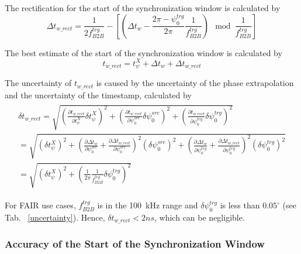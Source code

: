 The rectification for the start of the synchronization window is calculated by
\begin{equation}
\Delta t_\mathit{w\_rect}=\frac{1}{2f^\mathit{trg}_\mathit{B2B}}-[(\Delta t_\mathit{w} - \frac{2\pi-\psi^\mathit{trg}_0}{2\pi}\frac{1}{f^\mathit{trg}_\mathit{B2B}}) \mod \frac{1}{f^\mathit{trg}_\mathit{B2B}}]
\end{equation}

The best estimate of the start of the synchronization window is calculated by
\begin{equation}
t_\mathit{w\_rect}=t_\psi^\mathit{X}+\Delta t_\mathit{w}+\Delta t_\mathit{w\_rect}
\end{equation}

The uncertainty of $t_\mathit{w\_rect}$ is caused by the uncertainty of the phase extrapolation and the uncertainty of the timestamp, calculated by 
\begin{eqnarray}
\begin{aligned}
\delta t_\mathit{w\_rect} =\sqrt {(\frac {\partial t_\mathit{w\_rect}}{\partial t_\psi^\mathit{X}} \delta t_\psi^\mathit{X})^2 +(\frac {\partial t_\mathit{w\_rect}}{\partial \psi^\mathit{src}_0} \delta\psi^\mathit{src}_0)^2+(\frac {\partial t_\mathit{w\_rect}}{\partial \psi^\mathit{trg}_0} \delta\psi^\mathit{trg}_0)^2  }\\
=\sqrt {(\delta t_\psi^\mathit{X})^2 +(\frac {\partial \Delta t_\mathit{w}}{\partial \psi^\mathit{src}_0}+\frac {\partial \Delta t_\mathit{w\_rect}}{\partial \psi^\mathit{src}_0})^2 (\delta \psi^\mathit{src}_0)^2+(\frac {\partial \Delta t_\mathit{w}}{\partial \psi^\mathit{trg}_0}+\frac {\partial \Delta t_\mathit{w\_rect}}{\partial \psi^\mathit{trg}_0})^2 (\delta\psi^\mathit{trg}_0)^2 }\\
=\sqrt {(\delta t_\psi^\mathit{X})^2 + (\frac{1}{2\pi}\frac{1}{f^\mathit{trg}_\mathit{B2B}}\delta\psi^\mathit{trg}_0)^2}
\end{aligned}
\end{eqnarray}

For FAIR use cases, $f^\mathit{trg}_\mathit{B2B}$ is in the \SI{100}{kHz} range and $\delta\psi^\mathit{trg}_0$ is less than $0.05^\circ$ (see Tab. ~\ref{uncertainty}). Hence, $\delta t_\mathit{w\_rect} < 2ns$, which can be negligible. 

\subsubsection{Accuracy of the Start of the Synchronization Window}

